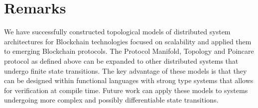 \documentclass[runningheads]{llncs}
\begin{document}
\section{Remarks} 
We have successfully constructed topological models of distributed system architectures for Blockchain technologies focused on scalability and applied them to emerging Blockchain protocols. The Protocol Manifold, Topology and Poincare protocol as defined above can be expanded to other distributed systems that undergo finite state transitions. The key advantage of these models is that they can be designed within functional languages with strong type systems that allows for verification at compile time. Future work can apply these models to systems undergoing more complex and possibly differentiable state transitions.
%
%
%


%
\end{document}
